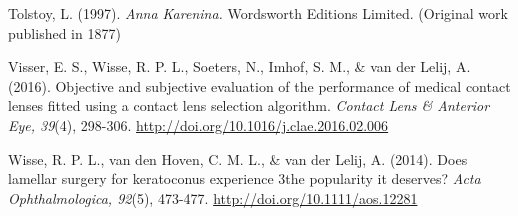 \documentclass[authordate, empirical]{jote-new-article}
\begin{document}
	Tolstoy, L. (1997). \emph{Anna Karenina. }Wordsworth Editions Limited. (Original work published in 1877)



	Visser, E. S., Wisse, R. P. L., Soeters, N., Imhof, S. M., \& van der Lelij, A. (2016). Objective and subjective evaluation of the performance of medical contact lenses fitted using a contact lens selection algorithm. \emph{Contact Lens \& Anterior Eye, 39}(4), 298-306. \url{http://doi.org/10.1016/j.clae.2016.02.006}



	Wisse, R. P. L., van den Hoven, C. M. L., \& van der Lelij, A. (2014). Does lamellar surgery for keratoconus experience 3the popularity it deserves? \emph{Acta Ophthalmologica, 92}(5), 473-477. \url{http://doi.org/10.1111/aos.12281}
\end{document}
